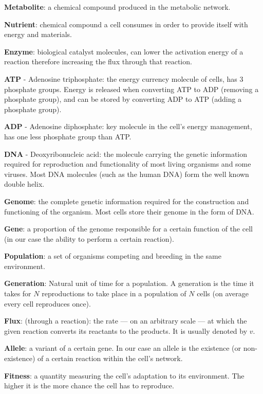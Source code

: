 \documentclass[a4paper,12pt]{article}
\begin{document}
	\begin{framed}

		\textbf{Metabolite}: a chemical compound produced in the metabolic network. 

		\textbf{Nutrient}: chemical compound a cell consumes in order to provide itself with energy and materials.

		\textbf{Enzyme}: biological catalyst molecules, can lower the activation energy of a reaction therefore increasing the flux through that reaction. 

	\textbf{ATP} - Adenosine triphosphate: the energy currency molecule of cells, has 3 phosphate groups. Energy is released when converting ATP to ADP (removing a phosphate group), and can be stored by converting ADP to ATP (adding a phosphate group).

	\textbf{ADP} - Adenosine diphosphate: key molecule in the cell's energy management, has one less phosphate group than ATP.

	\textbf{DNA} - Deoxyribonucleic acid: the molecule carrying the genetic information required for reproduction and functionality of most living organisms and some viruses. Most DNA molecules (such as the human DNA) form the well known double helix. 

	\textbf{Genome}: the complete genetic information required for the construction and functioning of the organism. Most cells store their genome in the form of DNA. 

	\textbf{Gene}: a proportion of the genome responsible for a certain function of the cell (in our case the ability to perform a certain reaction). 

	\textbf{Population}: a set of organisms competing and breeding in the same environment.

	\textbf{Generation}: Natural unit of time for a population. A generation is the time it takes for $N$ reproductions to take place in a population of $N$ cells (on average every cell reproduces once).

	\textbf{Flux}: (through a reaction): the rate ---  on an arbitrary scale --- at which the given reaction converts its reactants to the products. It is usually denoted by $v$. 

	\textbf{Allele}: a variant of a certain gene. In our case an allele is the existence (or non-existence) of a certain reaction within the cell's network.

	\textbf{Fitness}: a quantity measuring the cell's adaptation to its environment. The higher it is the more chance the cell has to reproduce.


\end{framed}
\end{document}
